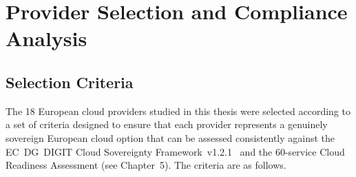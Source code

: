 \chapter{Provider Selection and Compliance Analysis}
\label{ch:provider_selection}

\section{Selection Criteria}
\label{sec:selection_criteria}

The 18 European cloud providers studied in this thesis were selected according to a set of criteria designed to ensure that each provider represents a genuinely sovereign European cloud option that can be assessed consistently against the EC~DG~DIGIT Cloud Sovereignty Framework~v1.2.1~\cite{EC_DIGIT_CloudSovereignty_2025} and the 60-service Cloud Readiness Assessment (see Chapter~5). The criteria are as follows.


